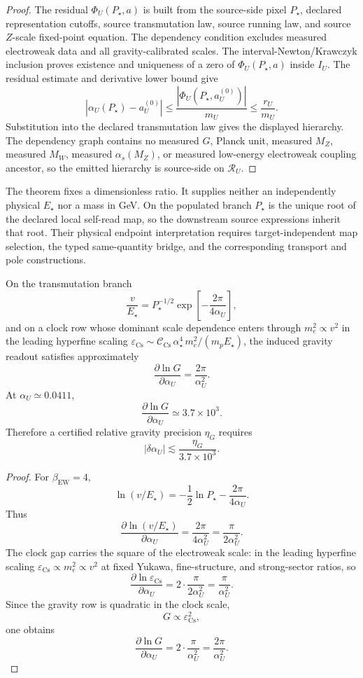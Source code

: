 \begin{proof}
The residual \(\Phi_U(P_\star,a)\) is built from the source-side pixel \(P_\star\), declared
representation cutoffs, source transmutation law, source running law, and source \(Z\)-scale
fixed-point equation. The dependency condition excludes measured electroweak data and all
gravity-calibrated scales. The interval-Newton/Krawczyk inclusion proves existence and uniqueness
of a zero of \(\Phi_U(P_\star,a)\) inside \(I_U\). The residual estimate and derivative lower
bound give
\[
|\alpha_U(P_\star)-a_U^{(0)}|
\le
\frac{|\Phi_U(P_\star,a_U^{(0)})|}{m_U}
\le
\frac{r_U}{m_U}.
\]
Substitution into the declared transmutation law gives the displayed hierarchy. The dependency
graph contains no measured \(G\), Planck unit, measured \(M_Z\), measured \(M_W\), measured
\(\alpha_s(M_Z)\), or measured low-energy electroweak coupling ancestor, so the emitted hierarchy
is source-side on \(\mathcal R_U\).
\end{proof}

The theorem fixes a dimensionless ratio. It supplies neither an independently physical
\(E_\star\) nor a mass in GeV. On the populated branch \(P_\star\) is the
unique root of the declared local self-read map, so the downstream source
expressions inherit that root. Their physical endpoint interpretation requires
target-independent map selection, the typed same-quantity bridge, and the
corresponding transport and pole constructions.

\begin{lemma}\label{lem:alpha-u-sensitivity}
On the transmutation branch
\[
\frac{v}{E_\star}
=
P_\star^{-1/2}
\exp\!\left[
-\frac{2\pi}{4\alpha_U}
\right],
\]
and on a clock row whose dominant scale dependence enters through \(m_e^2\propto v^2\) in the
leading hyperfine scaling \(\varepsilon_{\mathrm{Cs}}\sim\mathcal C_{\mathrm{Cs}}\,
\alpha_\star^4\,m_e^2/(m_pE_\star)\), the induced
gravity readout satisfies approximately
\[
\frac{\partial\ln G}{\partial \alpha_U}
=
\frac{2\pi}{\alpha_U^2}.
\]
At \(\alpha_U\simeq0.0411\),
\[
\frac{\partial\ln G}{\partial \alpha_U}
\simeq
3.7\times10^3.
\]
Therefore a certified relative gravity precision \(\eta_G\) requires
\[
|\delta\alpha_U|
\lesssim
\frac{\eta_G}{3.7\times10^3}.
\]
\end{lemma}

\begin{proof}
For \(\beta_{\mathrm{EW}}=4\),
\[
\ln(v/E_\star)
=
-\frac12\ln P_\star
-
\frac{2\pi}{4\alpha_U}.
\]
Thus
\[
\frac{\partial\ln(v/E_\star)}{\partial\alpha_U}
=
\frac{2\pi}{4\alpha_U^2}
=
\frac{\pi}{2\alpha_U^2}.
\]
The clock gap carries the square of the electroweak scale: in the leading hyperfine scaling
\(\varepsilon_{\mathrm{Cs}}\propto m_e^2\propto v^2\) at fixed Yukawa, fine-structure, and
strong-sector ratios, so
\[
\frac{\partial\ln \varepsilon_{\mathrm{Cs}}}{\partial\alpha_U}
=
2\cdot\frac{\pi}{2\alpha_U^2}
=
\frac{\pi}{\alpha_U^2}.
\]
Since the gravity row is quadratic in the clock scale,
\[
G\propto \varepsilon_{\mathrm{Cs}}^2,
\]
one obtains
\[
\frac{\partial\ln G}{\partial\alpha_U}
=
2\cdot\frac{\pi}{\alpha_U^2}
=
\frac{2\pi}{\alpha_U^2}.
\]
\end{proof}

